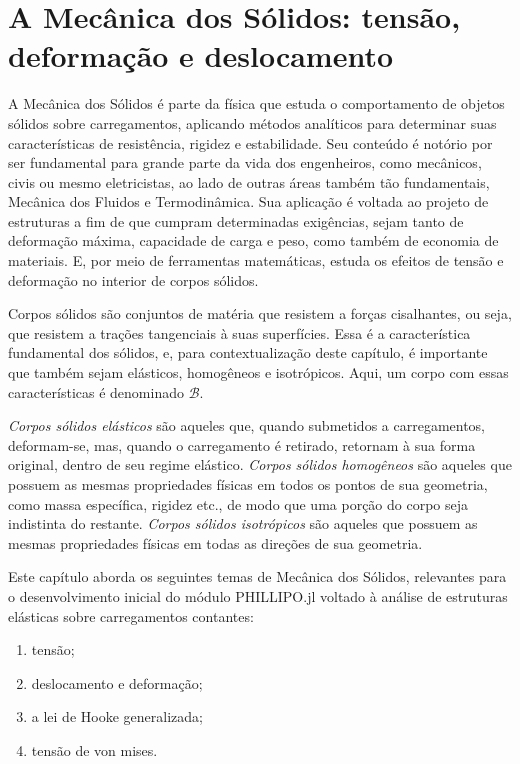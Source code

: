 \chapter{A Mecânica dos Sólidos: tensão, deformação e deslocamento}

A Mecânica dos Sólidos é parte da física que estuda o comportamento de objetos sólidos sobre carregamentos, aplicando métodos analíticos para determinar suas características de resistência, rigidez e estabilidade. Seu conteúdo é notório por ser fundamental para grande parte da vida dos engenheiros, como mecânicos, civis ou mesmo eletricistas, ao lado de outras áreas também tão fundamentais, Mecânica dos Fluidos e Termodinâmica. Sua aplicação é voltada ao projeto de estruturas a fim de que cumpram determinadas exigências, sejam tanto de deformação máxima, capacidade de carga e peso, como também de economia de materiais. E, por meio de ferramentas matemáticas, estuda os efeitos de tensão e deformação no interior de corpos sólidos. \cite[pág. 2]{popov}

Corpos sólidos são conjuntos de matéria que resistem a forças cisalhantes, ou seja, que resistem a trações tangenciais à suas superfícies. Essa é a característica fundamental dos sólidos, e, para contextualização deste capítulo, é importante que também sejam elásticos, homogêneos e isotrópicos. Aqui, um corpo com essas características é denominado $\mathcal{B}$.

\emph{Corpos sólidos elásticos} são aqueles que, quando submetidos a carregamentos, deformam-se, mas, quando o carregamento é retirado, retornam à sua forma original, dentro de seu regime elástico. \emph{Corpos sólidos homogêneos} são aqueles que possuem as mesmas propriedades físicas em todos os pontos de sua geometria, como massa específica, rigidez etc., de modo que uma porção do corpo seja indistinta do restante. \emph{Corpos sólidos isotrópicos} são aqueles que possuem as mesmas propriedades físicas em todas as direções de sua geometria.

Este capítulo aborda os seguintes temas de Mecânica dos Sólidos, relevantes para o desenvolvimento inicial do módulo PHILLIPO.jl voltado à análise de estruturas elásticas sobre carregamentos contantes:
\begin{enumerate}
    \item tensão;
    \item deslocamento e deformação;
    \item a lei de Hooke generalizada;
    \item tensão de von mises.
\end{enumerate}

